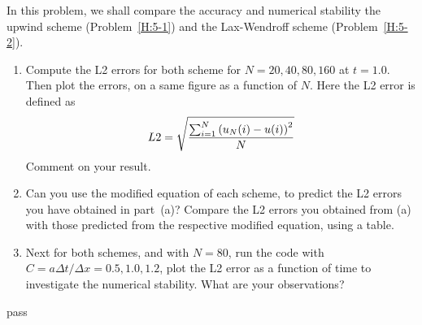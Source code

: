\begin{homework}[label={H:5-3}]
    In this problem, we shall compare the accuracy and numerical stability the upwind scheme (Problem~\ref{H:5-1}) and the Lax-Wendroff scheme (Problem~\ref{H:5-2}).

    \begin{enumerate}[label=(\alph*)]
        \item Compute the L2 errors for both scheme for $N=20, 40, 80, 160$ at $t=1.0$. Then plot the errors, on a same figure as a function of $N$. Here the L2 error is defined as
            \begin{equation}\label{E:5-3-1}
                L2 = \sqrt{
                    \frac{\sum_{i=1}^N\qty(u_N(i)-u(i))^2}{N}
                }
            \end{equation}
            Comment on your result.
        \item Can you use the modified equation of each scheme, to predict the L2 errors you have obtained in part~(a)? Compare the L2 errors you obtained from (a) with those predicted from the respective modified equation, using a table.
        \item Next for both schemes, and with $N=80$, run the code with $C=a\Delta t/\Delta x=0.5, 1.0, 1.2$, plot the L2 error as a function of time to investigate the numerical stability. What are your observations?
    \end{enumerate}
\end{homework}

pass
